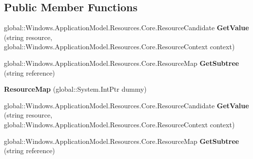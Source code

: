 \subsection*{Public Member Functions}
\begin{DoxyCompactItemize}
\item 
\mbox{\label{class_windows_1_1_application_model_1_1_resources_1_1_core_1_1_resource_map_aef94042cd27f045f8035733034f6e2c4}} 
global\+::\+Windows.\+Application\+Model.\+Resources.\+Core.\+Resource\+Candidate {\bfseries Get\+Value} (string resource, global\+::\+Windows.\+Application\+Model.\+Resources.\+Core.\+Resource\+Context context)
\item 
\mbox{\label{class_windows_1_1_application_model_1_1_resources_1_1_core_1_1_resource_map_ac129a8e320a6dc314ec3767626950aa8}} 
global\+::\+Windows.\+Application\+Model.\+Resources.\+Core.\+Resource\+Map {\bfseries Get\+Subtree} (string reference)
\item 
\mbox{\label{class_windows_1_1_application_model_1_1_resources_1_1_core_1_1_resource_map_af0aec2b4469c89c900f7eed2f53504bf}} 
{\bfseries Resource\+Map} (global\+::\+System.\+Int\+Ptr dummy)
\item 
\mbox{\label{class_windows_1_1_application_model_1_1_resources_1_1_core_1_1_resource_map_aef94042cd27f045f8035733034f6e2c4}} 
global\+::\+Windows.\+Application\+Model.\+Resources.\+Core.\+Resource\+Candidate {\bfseries Get\+Value} (string resource, global\+::\+Windows.\+Application\+Model.\+Resources.\+Core.\+Resource\+Context context)
\item 
\mbox{\label{class_windows_1_1_application_model_1_1_resources_1_1_core_1_1_resource_map_ac129a8e320a6dc314ec3767626950aa8}} 
global\+::\+Windows.\+Application\+Model.\+Resources.\+Core.\+Resource\+Map {\bfseries Get\+Subtree} (string reference)
\item 
\mbox{\label{class_windows_1_1_application_model_1_1_resources_1_1_core_1_1_resource_map_af0aec2b4469c89c900f7eed2f53504bf}} 

\end{DoxyCompactItemize}
